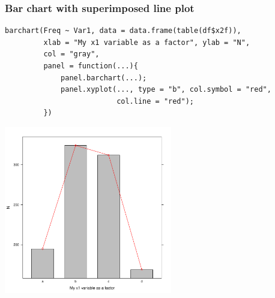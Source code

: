 \documentclass[bigger]{beamer}
\begin{document}
\begin{frame}[fragile,shrink = 10]
\frametitle{Bar chart with superimposed line plot}
\label{sec-2_13}

\lstset{language=R}
\begin{lstlisting}
barchart(Freq ~ Var1, data = data.frame(table(df$x2f)), 
         xlab = "My x1 variable as a factor", ylab = "N",
         col = "gray",
         panel = function(...){
             panel.barchart(...);
             panel.xyplot(..., type = "b", col.symbol = "red", 
                          col.line = "red");
         })
\end{lstlisting}



\includegraphics[width=0.55\textwidth]{../graphs/lattice_barchart_lines.pdf}
\end{frame}
\end{document}
